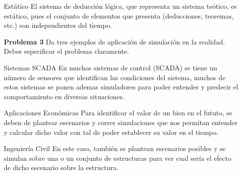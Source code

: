 \documentclass{article}
\begin{document}
\begin{enumerate}
\item[{Estático}] El sistema de deducción lógica, que representa un sistema teótico, es estático, pues el conjunto de elementos que presenta (deducciones, teoremas, etc.) son independientes del tiempo.\\

\item[\bf{Problema 3}] Da tres ejemplos de aplicación de simulación en la realidad. Debes especificar el problema claramente.\\

\item[{Sistemas SCADA}]  En muchos sistemas de control (SCADA) se tiene un número de sensores que identifican las condiciones del sistema, muchos de estos sistemas se ponen ademas simuladores para poder entender y predecir el comportamiento en diversas situaciones.\\

\item[{Aplicaciones Económicas}] Para identificar el valor de un bien en el fututo, se deben de plantear escenarios y correr simulaciones que nos permitan entender y calcular dicho valor con tal de poder establecer su valor en el tiempo.\\

\item[{Ingeniería Civil}] En este caso, también se plantean escenarios posibles y se simulan sobre una o un conjunto de estructuras para ver cual sería el efecto de dicho escenario sobre la estructura.\\

\end{enumerate}
\end{document}
